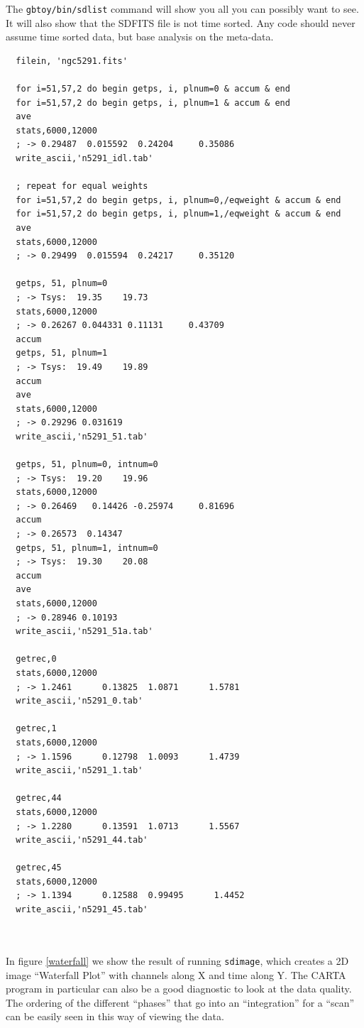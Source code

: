 \documentclass[12pt,a4paper]{article}
\begin{document}
The {\tt gbtoy/bin/sdlist} command will show you all you can possibly
want to see. It will also show  that the SDFITS file is
not time sorted. Any code should never assume time sorted data, but base
analysis on the meta-data.


\begin{lstlisting}
  filein, 'ngc5291.fits'
  
  for i=51,57,2 do begin getps, i, plnum=0 & accum & end  
  for i=51,57,2 do begin getps, i, plnum=1 & accum & end
  ave
  stats,6000,12000
  ; -> 0.29487  0.015592  0.24204     0.35086
  write_ascii,'n5291_idl.tab'

  ; repeat for equal weights
  for i=51,57,2 do begin getps, i, plnum=0,/eqweight & accum & end  
  for i=51,57,2 do begin getps, i, plnum=1,/eqweight & accum & end
  ave
  stats,6000,12000
  ; -> 0.29499  0.015594  0.24217     0.35120

  getps, 51, plnum=0
  ; -> Tsys:  19.35    19.73
  stats,6000,12000
  ; -> 0.26267 0.044331 0.11131     0.43709
  accum
  getps, 51, plnum=1
  ; -> Tsys:  19.49    19.89
  accum
  ave
  stats,6000,12000
  ; -> 0.29296 0.031619
  write_ascii,'n5291_51.tab'

  getps, 51, plnum=0, intnum=0
  ; -> Tsys:  19.20    19.96
  stats,6000,12000
  ; -> 0.26469   0.14426 -0.25974     0.81696
  accum
  ; -> 0.26573  0.14347
  getps, 51, plnum=1, intnum=0
  ; -> Tsys:  19.30    20.08
  accum
  ave
  stats,6000,12000
  ; -> 0.28946 0.10193
  write_ascii,'n5291_51a.tab'

  getrec,0
  stats,6000,12000
  ; -> 1.2461      0.13825  1.0871      1.5781
  write_ascii,'n5291_0.tab'
  
  getrec,1
  stats,6000,12000  
  ; -> 1.1596      0.12798  1.0093      1.4739
  write_ascii,'n5291_1.tab'
  
  getrec,44
  stats,6000,12000  
  ; -> 1.2280      0.13591  1.0713      1.5567
  write_ascii,'n5291_44.tab'

  getrec,45
  stats,6000,12000  
  ; -> 1.1394      0.12588  0.99495      1.4452
  write_ascii,'n5291_45.tab'
  
  
\end{lstlisting}

In figure \ref{waterfall} we show the result of running {\tt sdimage},
which creates a 2D image ``Waterfall Plot'' with channels along X and
time along Y. The CARTA program in particular can also be a good
diagnostic to look at the data quality.  The ordering of the different
``phases'' that go into an ``integration'' for a ``scan'' can be
easily seen in this way of viewing the data.
\end{document}
